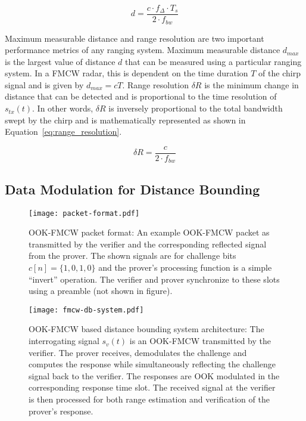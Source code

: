 \documentclass{sig-alternate-10pt}
\begin{document}
\begin{equation}
\label{eq:for_d}
 d = \frac{c \cdot f_{\Delta} \cdot T_{s}}{2 \cdot f_{bw}}
\end{equation}

Maximum measurable distance and range resolution are two important performance
metrics of any ranging system. Maximum measurable distance $d_{max}$ is the largest
value of distance $d$ that can be measured using a particular ranging system.
In a FMCW radar, this is dependent on the time duration $T$ of the chirp signal
and is given by $d_{max}=cT$. Range resolution $\delta R$ is the minimum change in
distance that can be detected and is proportional to the time resolution of
$s_{tx}(t)$. In other words, $\delta R$ is inversely proportional to the total
bandwidth swept by the chirp and is mathematically represented as shown in
Equation~\eqref{eq:range_resolution}.

\begin{equation}
  \label{eq:range_resolution}
  \delta R = \frac{c}{2 \cdot f_{bw}}
\end{equation}

\subsection{Data Modulation for Distance Bounding}
\label{subsec:ask-fmcw}

\begin{figure*}[t]
  \centering
  \texttt{[image: packet-format.pdf]}
  \caption{OOK-FMCW packet format: An example OOK-FMCW packet as transmitted by
    the verifier and the corresponding reflected signal from the prover. The
    shown signals are for challenge bits $c[n]=\{1,0,1,0\}$ and the prover's
    processing function is a simple ``invert'' operation. The verifier and
    prover synchronize to these slots using a preamble (not shown in figure).}
  \label{fig:packet-format}
\end{figure*}
\begin{figure*}[t]
  \centering
  \texttt{[image: fmcw-db-system.pdf]}
  \caption{OOK-FMCW based distance bounding system architecture: The
    interrogating signal $s_v(t)$ is an OOK-FMCW transmitted by the verifier.
    The prover receives, demodulates the challenge and computes the response
    while simultaneously reflecting the challenge signal back to the verifier.
    The responses are OOK modulated in the corresponding response time slot. The
    received signal at the verifier is then processed for both range estimation
    and verification of the prover's response.}
  \label{fig:fmcw-db-system}
\end{figure*}
\end{document}
